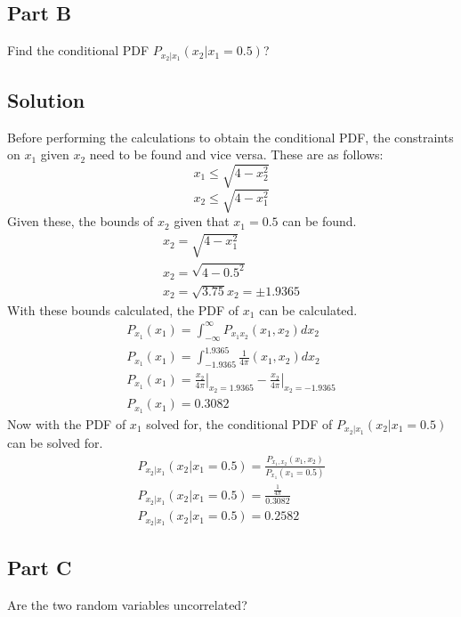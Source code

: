 \documentclass{article}
\begin{document}
\subsection*{Part B}
Find the conditional PDF $P_{x_2 | x_1}(x_2 | x_1 = 0.5)$?
\subsection*{Solution}
Before performing the calculations to obtain the conditional PDF, the constraints on $x_1$ given $x_2$ need to be found and vice versa.
These are as follows:
\begin{equation}
    x_1\leq\sqrt{4 - x_2^2}
\end{equation}
\begin{equation}
    x_2\leq\sqrt{4 - x_1^2}
\end{equation}
Given these, the bounds of $x_2$ given that $x_1=0.5$ can be found.
\begin{gather*}
    x_2 = \sqrt{4 - x_1^2} \\
    x_2 = \sqrt{4 - 0.5^2} \\ 
    x_2 = \sqrt{3.75} 
    x_2 = \pm 1.9365
\end{gather*}
With these bounds calculated, the PDF of $x_1$ can be calculated.
\begin{gather*}
    P_{x_1}(x_1) = \int_{-\infty}^{\infty}P_{x_1x_2}(x_1,x_2)dx_2 \\
    P_{x_1}(x_1) = \int_{-1.9365}^{1.9365}\frac{1}{4\pi}(x_1,x_2)dx_2 \\
    P_{x_1}(x_1) = \left .\frac{x_2}{4\pi}\right\rvert_{x_2=1.9365} - \left .\frac{x_2}{4\pi}\right\rvert_{x_2=-1.9365} \\
    P_{x_1}(x_1) = 0.3082
\end{gather*}
Now with the PDF of $x_1$ solved for, the conditional PDF of $P_{x_2 | x_1}(x_2 | x_1 = 0.5)$ can be solved for.
\begin{gather*}
    P_{x_2 | x_1}(x_2 | x_1 = 0.5) = \frac{P_{x_1,x_2}(x_1,x_2)}{P_{x_1}(x_1=0.5)} \\
    P_{x_2 | x_1}(x_2 | x_1 = 0.5) = \frac{\frac{1}{4\pi}}{0.3082} \\
    P_{x_2 | x_1}(x_2 | x_1 = 0.5) = 0.2582
\end{gather*}

\subsection*{Part C}
Are the two random variables uncorrelated?
\end{document}
